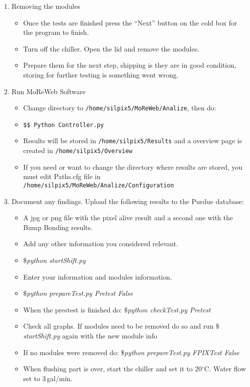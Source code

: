 \documentclass[12pt]{unlsilabsop}
\begin{document}
\begin{enumerate}
   \item Removing the modules
   \begin{itemize}
   		\item Once the tests are finished press the ``Next'' button on the cold box for the program to finish.
   		\item Turn off the chiller. Open the lid and remove the modules.
   		\item Prepare them for the next step, shipping is they are in good condition, storing for further testing is something went wrong.
	\end{itemize} 
	 \item Run MoReWeb Software
    \begin{itemize}
    		\item Change directory to \texttt{/home/silpix5/MoReWeb/Analize}, then do:
    		\item \texttt{\$\$ Python Controller.py}
    		\item Results will be stored in \texttt{/home/silpix5/Results} and a overview page is created in \texttt{/home/silpix5/Overview}
    		\item If you need or want to change the directory where results are stored, you must edit Paths.cfg file in \texttt{/home/silpix5/MoReWeb/Analize/Configuration}
   \end{itemize}  	
    \item Document any findings. Upload the following results to the Purdue database:
    \begin{itemize}
    		\item A jpg or png file with the pixel alive result and a second one with the Bump Bonding results.
    		\item Add any other information you considered relevant.
    		\item {$\$ $\it{python startShift.py}}
    		\item Enter your information and modules information.
    		\item {$\$ $\it{python prepareTest.py Pretest False}}
    		\item When the prestest is finished do: {$\$ $\it{python checkTest.py Pretest}}
    		\item Check all graphs. If modules need to be removed do so and run {$\$ $\it{startShift.py}} again with the new module info
    		\item If no modules were removed do: {$\$ $\it{python prepareTest.py FPIXTest False}}
    		\item When flushing part is over, start the chiller and set it to 20$^\circ$C. Water flow set to 3\,gal/min.

\end{itemize}
\end{enumerate}
\end{document}
